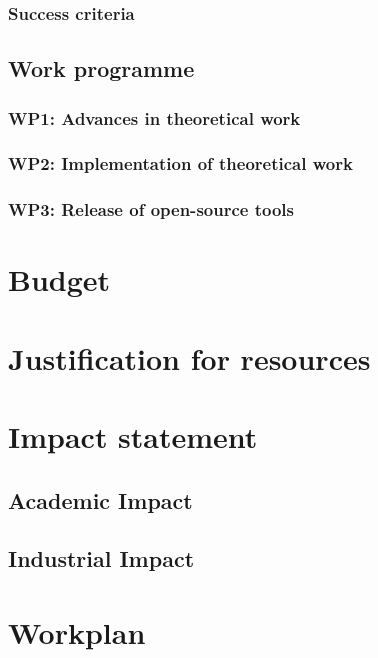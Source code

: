 \documentclass[a4paper,11pt]{article}
\begin{document}
    \subsubsection{Success criteria}

    \subsection{Work programme}

    \subsubsection*{WP1: Advances in theoretical work}

    \subsubsection*{WP2: Implementation of theoretical work}

    \subsubsection*{WP3: Release of open-source tools}

    \section{Budget}

    \section{Justification for resources}

    \section{Impact statement}

    \subsection{Academic Impact}

    \subsection{Industrial Impact}

    \section{Workplan}

    
\end{document}
